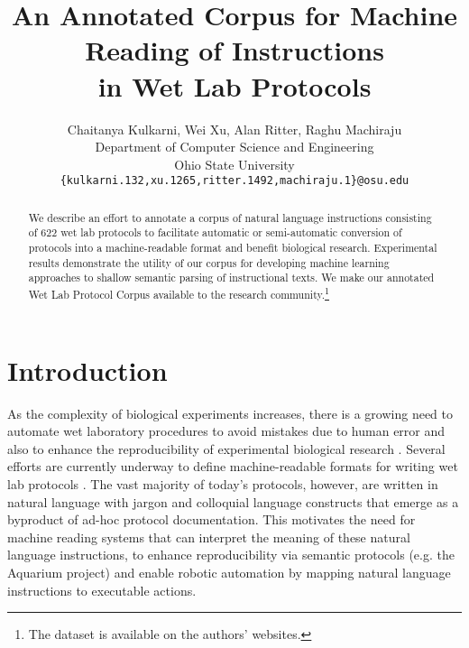 \documentclass[11pt,a4paper]{article}
\title{An Annotated Corpus for Machine Reading of Instructions \\ in Wet Lab Protocols}
\author{Chaitanya Kulkarni, Wei Xu, Alan Ritter, Raghu Machiraju \\
Department of Computer Science and Engineering\\ 
Ohio State University\\
{\tt \{kulkarni.132,xu.1265,ritter.1492,machiraju.1\}@osu.edu}
}
\date{}
\begin{document}
 \graphicspath{{./images/}}
\maketitle
\begin{abstract}
 We describe an effort to annotate a corpus of natural language instructions consisting of 622 wet lab protocols to facilitate automatic or semi-automatic conversion of protocols into a machine-readable format and benefit biological research. Experimental results demonstrate the utility of our corpus for developing machine learning approaches to shallow semantic parsing of instructional texts. We make our annotated Wet Lab Protocol Corpus available to the research community.\footnote{The dataset is available on the authors' websites.}
\end{abstract}

\section{Introduction}
As the complexity of biological experiments increases, there is a growing need to automate wet laboratory procedures to avoid mistakes due to human error and also to enhance the reproducibility of experimental biological research \cite{king2009automation}.  Several efforts are currently underway to define machine-readable formats for writing wet lab protocols \cite{ananthanarayanan2010biocoder,soldatova2014exact2,vasilev2011software}. The vast majority of today's  protocols, however, are written in natural language with jargon and colloquial 
language constructs that emerge as a byproduct of ad-hoc protocol documentation. This motivates the need for machine reading systems that can interpret the meaning of these natural language instructions, to enhance reproducibility via semantic protocols (e.g. the Aquarium project) and enable robotic automation \cite{doi:10.1021/acssynbio.6b00108} by mapping natural language instructions to executable actions.

\end{document}
